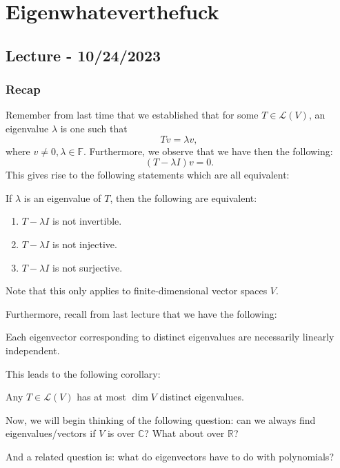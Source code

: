 \documentclass[openany]{book}
\newcommand{\CC}{\mathbb{C}}
\newcommand{\RR}{\mathbb{R}}
\begin{document}
\chapter{Eigenwhateverthefuck}
\section{Lecture - 10/24/2023}
\subsection{Recap}
Remember from last time that we established that for some $T \in \mathcal L(V)$, an eigenvalue $\lambda$ is one such that
\begin{equation*}
	Tv = \lambda v, 
\end{equation*}
where $v \neq 0, \lambda \in \mathbb{F}$. Furthermore, we observe that we have then the following:
\begin{equation*}
	(T- \lambda I)v = 0.
\end{equation*}
 This gives rise to the following statements which are all equivalent:
 \begin{thm}
 	If $\lambda$ is an eigenvalue of $T$, then the following are equivalent:
 	\begin{enumerate}
 		\item $T - \lambda I$ is not invertible.
 		\item $T - \lambda I$ is not injective.
 		\item $T - \lambda I$ is not surjective.
 	\end{enumerate}
 
 	Note that this only applies to finite-dimensional vector spaces $V$.
 \end{thm}

Furthermore, recall from last lecture that we have the following:
\begin{thm}
	Each eigenvector corresponding to distinct eigenvalues are necessarily linearly independent.
\end{thm}

This leads to the following corollary:
\begin{cor}
	Any $T \in \mathcal L(V)$ has at most $\dim V$ distinct eigenvalues.
\end{cor}

Now, we will begin thinking of the following question: can we always find eigenvalues/vectors if $V$ is over $\CC$? What about over $\RR$?

And a related question is: what do eigenvectors have to do with polynomials?
\end{document}

